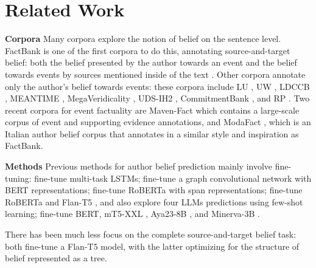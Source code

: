\section{Related Work}
\label{sec:relwork}
\noindent\textbf{Corpora } Many corpora explore the notion of belief on the sentence level. FactBank is one of the first corpora to do this, annotating source-and-target belief: both the belief presented by the author towards an event and the belief towards events by sources mentioned inside of the text \citep{sauri2009factbank}.
Other corpora annotate only the author's belief towards events: these corpora include LU \cite{diab-etal-2009-committed}, UW \cite{lee-etal-2015-event}, LDCCB \citep{prabhakaran-etal-2015-new}, MEANTIME \citep{minard-etal-2016-meantime}, MegaVeridicality \cite{white-etal-2018-lexicosyntactic},  UDS-IH2 \citep{rudinger-etal-2018-neural-models}, CommitmentBank \citep{de2019commitmentbank}, and RP \citep{ross-pavlick-2019-well}. Two recent corpora for event factuality are Maven-Fact \citep{li-etal-2024-maven} which contains a large-scale corpus of event and supporting evidence annotations, 
and ModaFact \citep{rovera-etal-2025-modafact}, which is an Italian author belief corpus that annotates in a similar style and inspiration as FactBank. 

\noindent\textbf{Methods} Previous methods for author belief prediction mainly involve fine-tuning: \citet{rudinger-etal-2018-neural-models} fine-tune multi-task LSTMs; \citet{pouran-ben-veyseh-etal-2019-graph} fine-tune a graph convolutional network with BERT \citep{devlin-etal-2019-bert} representations; \citet{jiang-de-marneffe-2021-thinks, murzaku-etal-2022-examining} fine-tune RoBERTa \citep{liu2019roberta} with span representations; \citet{li-etal-2024-maven} fine-tune RoBERTa and Flan-T5 \citep{chung2024scaling}, and also explore four LLMs predictions using few-shot learning; \citet{rovera-etal-2025-modafact} fine-tune BERT, mT5-XXL \citep{xue-etal-2021-mt5}, Aya23-8B \citep{aryabumi2024aya}, and Minerva-3B \citep{orlando2024minerva}.

There has been much less focus on the complete source-and-target belief task: \citet{murzaku-etal-2023-towards, murzaku-rambow-2024-beleaf} both fine-tune a Flan-T5 model, with the latter optimizing for the structure of belief represented as a tree.